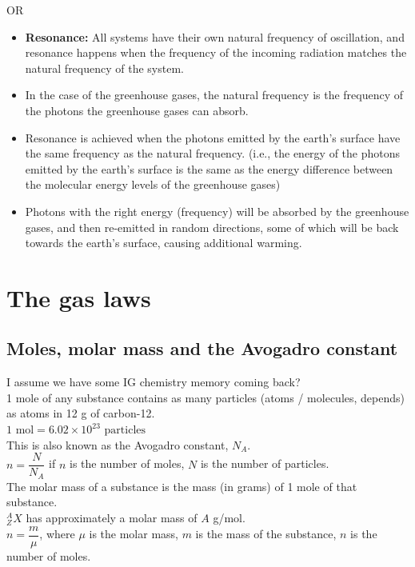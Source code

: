 \documentclass[a4paper,12pt]{article}
\begin{document}
OR
\begin{itemize}
  \item \textbf{Resonance:} All systems have their own natural frequency of oscillation, and resonance happens when the frequency of the incoming radiation matches the natural frequency of the system.
  \item In the case of the greenhouse gases, the natural frequency is the frequency of the photons the greenhouse gases can absorb.
  \item Resonance is achieved when the photons emitted by the earth's surface have the same frequency as the natural frequency. (i.e., the energy of the photons emitted by the earth's surface is the same as the energy difference between the molecular energy levels of the greenhouse gases)
  \item Photons with the right energy (frequency) will be absorbed by the greenhouse gases, and then re-emitted in random directions, some of which will be back towards the earth's surface, causing additional warming.
\end{itemize}
\section{The gas laws}
\subsection{Moles, molar mass and the Avogadro constant}
I assume we have some IG chemistry memory coming back?\\
1 mole of any substance contains as many particles (atoms / molecules, depends) as atoms in 12 g of carbon-12.\\
$1 \text{ mol} = 6.02 \times 10^{23} \text{ particles}$\\
This is also known as the Avogadro constant, $N_A$.\\
$n=\dfrac{N}{N_A}$ if $n$ is the number of moles, $N$ is the number of particles.\\
The molar mass of a substance is the mass (in grams) of 1 mole of that substance.\\
$_Z^AX$ has approximately a molar mass of $A$ g/mol.\\
$n=\dfrac{m}{\mu}$, where $\mu$ is the molar mass, $m$ is the mass of the substance, $n$ is the number of moles.
\end{document}
